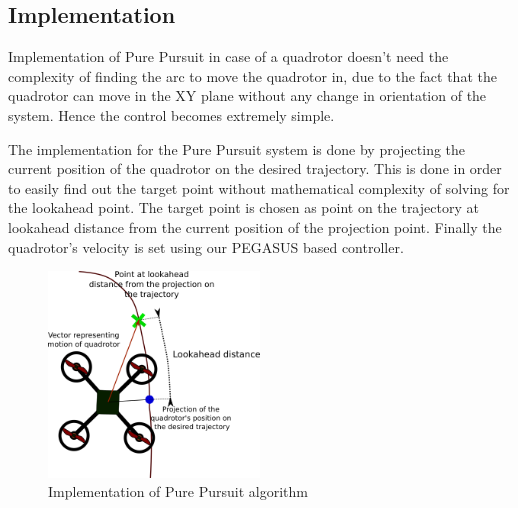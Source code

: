 \documentclass[hidelinks,BTech]{iitmdiss}
\begin{document}
\subsection{Implementation}
Implementation of Pure Pursuit in case of a quadrotor doesn't need the complexity of finding the arc to move the quadrotor in, due to the fact that the quadrotor can move in the XY plane without any change in orientation of the system. Hence the control becomes extremely simple.

The implementation for the Pure Pursuit system is done by projecting the current position of the quadrotor on the desired trajectory. This is done in order to easily find out the target point without mathematical complexity of solving for the lookahead point. The target point is chosen as point on the trajectory at lookahead distance from the current position of the projection point. Finally the quadrotor's velocity is set using our PEGASUS based controller.
\begin{figure}[H]
  \centering
    \includegraphics[width=0.5\textwidth]{Pure_Pursuit_implementation.png}
    \caption{Implementation of Pure Pursuit algorithm}
\end{figure}
\end{document}
